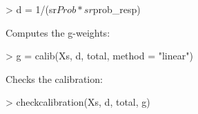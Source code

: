 \documentclass[a4paper]{article}
\begin{document}
\begin{Schunk}
\begin{Sinput}
> d = 1/(sr$Prob * sr$prob_resp)
\end{Sinput}
\end{Schunk}
Computes the g-weights:

\begin{Schunk}
\begin{Sinput}
> g = calib(Xs, d, total, method = "linear")
\end{Sinput}
\end{Schunk}
Checks the calibration:

\begin{Schunk}
\begin{Sinput}
> checkcalibration(Xs, d, total, g)
\end{Sinput}
\end{Schunk}
\end{document}
